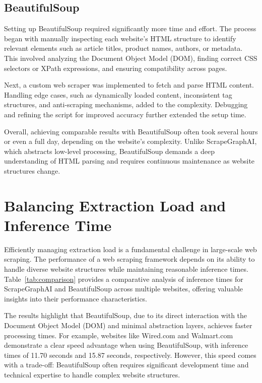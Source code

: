 \subsection{BeautifulSoup}
Setting up BeautifulSoup required significantly more time and effort. The process began with manually inspecting each website's HTML structure to identify relevant elements such as article titles, product names, authors, or metadata. This involved analyzing the Document Object Model (DOM), finding correct CSS selectors or XPath expressions, and ensuring compatibility across pages.

Next, a custom web scraper was implemented to fetch and parse HTML content. Handling edge cases, such as dynamically loaded content, inconsistent tag structures, and anti-scraping mechanisms, added to the complexity. Debugging and refining the script for improved accuracy further extended the setup time.

Overall, achieving comparable results with BeautifulSoup often took several hours or even a full day, depending on the website's complexity. Unlike ScrapeGraphAI, which abstracts low-level processing, BeautifulSoup demands a deep understanding of HTML parsing and requires continuous maintenance as website structures change.

\section{Balancing Extraction Load and Inference Time}

Efficiently managing extraction load is a fundamental challenge in large-scale web scraping. The performance of a web scraping framework depends on its ability to handle diverse website structures while maintaining reasonable inference times. Table~\ref{tab:comparison} provides a comparative analysis of inference times for ScrapeGraphAI and BeautifulSoup across multiple websites, offering valuable insights into their performance characteristics.

The results highlight that BeautifulSoup, due to its direct interaction with the Document Object Model (DOM) and minimal abstraction layers, achieves faster processing times. For example, websites like Wired.com and Walmart.com demonstrate a clear speed advantage when using BeautifulSoup, with inference times of 11.70 seconds and 15.87 seconds, respectively. However, this speed comes with a trade-off: BeautifulSoup often requires significant development time and technical expertise to handle complex website structures.


